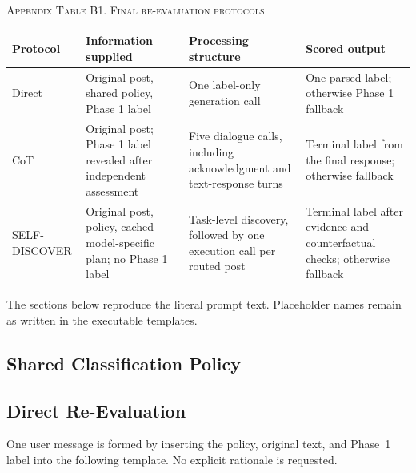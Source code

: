 \documentclass{ieeeaccess}
\begin{document}
\par\medskip
\noindent\textsc{Appendix Table B1. Final re-evaluation protocols}\par\smallskip
{\small\renewcommand{\arraystretch}{1.18}
\noindent\begin{tabularx}{\textwidth}{@{}p{}YYY@{}}\toprule
Protocol & Information supplied & Processing structure & Scored output \\\midrule
Direct & Original post, shared policy, Phase 1 label & One label-only generation call & One parsed label; otherwise Phase 1 fallback \\
CoT & Original post; Phase 1 label revealed after independent assessment & Five dialogue calls, including acknowledgment and text-response turns & Terminal label from the final response; otherwise fallback \\
SELF-DISCOVER & Original post, policy, cached model-specific plan; no Phase 1 label & Task-level discovery, followed by one execution call per routed post & Terminal label after evidence and counterfactual checks; otherwise fallback \\\bottomrule
\end{tabularx}}\par\medskip
The sections below reproduce the literal prompt text. Placeholder names remain as written in the executable templates.

\subsection{Shared Classification Policy}

\subsection{Direct Re-Evaluation}
One user message is formed by inserting the policy, original text, and Phase~1 label into the following template. No explicit rationale is requested.

\end{document}
